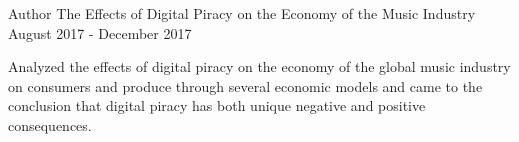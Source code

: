 

\begin{cventries}

  \cventry
    {Author} %
    {The Effects of Digital Piracy on the Economy of the Music Industry} %
    {} %
    {August 2017 - December 2017} %
    {
      \begin{cvitems} %
        \item {Analyzed the effects of digital piracy on the economy of the global music industry on consumers and produce through several economic models and came to the conclusion that digital piracy has both unique negative and positive consequences.}
      \end{cvitems}
    }

\end{cventries}
